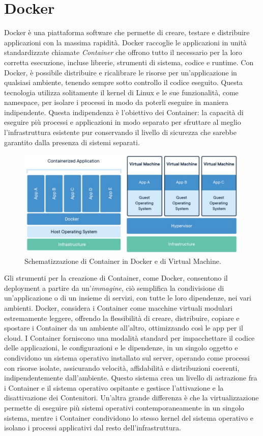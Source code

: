 \section{Docker}
Docker è una piattaforma software che permette di creare, testare e distribuire applicazioni con la massima rapidità. Docker raccoglie 
le applicazioni in unità standardizzate chiamate \textit{Container} che offrono tutto il necessario per la loro corretta esecuzione, incluse librerie, 
strumenti di sistema, codice e runtime. Con Docker, è possibile distribuire e ricalibrare le risorse per un'applicazione in qualsiasi ambiente, 
tenendo sempre sotto controllo il codice eseguito.\hfill\break
Questa tecnologia utilizza solitamente il kernel di Linux e le sue funzionalità, come namespace, per isolare i processi in modo da poterli 
eseguire in maniera indipendente. Questa indipendenza è l'obiettivo dei Container: la capacità di eseguire più processi e applicazioni in 
modo separato per sfruttare al meglio l'infrastruttura esistente pur conservando il livello di sicurezza che sarebbe garantito dalla 
presenza di sistemi separati.
%
\begin{figure}[ht!]
    \centering
    \includegraphics[scale=0.55]{images/Docker_Config_Container.jpg}
    \caption[Schema di funzionamento di un Container in Docker]{Schematizzazione di Container in Docker e di Virtual Machine.}
    \label{fig:DCC}
\end{figure}
\hfill\break
Gli strumenti per la creazione di Container, come Docker, consentono il deployment a partire da un'\textit{immagine}, ciò semplifica la condivisione di 
un'applicazione o di un insieme di servizi, con tutte le loro dipendenze, nei vari ambienti.
Docker, considera i Container come macchine virtuali modulari estremamente leggere, offrendo la flessibilità di creare, distribuire, 
copiare e spostare i Container da un ambiente all'altro, ottimizzando così le app per il cloud.\hfill\break
I Container forniscono una modalità standard per impacchettare il codice delle applicazioni, le configurazioni e le dipendenze, in un singolo oggetto e 
condividono un sistema operativo installato sul server, operando come processi con risorse isolate, assicurando velocità, affidabilità e distribuzioni coerenti, 
indipendentemente dall’ambiente.\hfill\break
%
Questo sistema crea un livello di astrazione fra i Container e il sistema operativo ospitante e gestisce l’attivazione e la disattivazione dei Contenitori. 
Un'altra grande differenza è che la virtualizzazione permette di eseguire più sistemi operativi contemporaneamente in un singolo sistema, mentre i Container 
condividono lo stesso kernel del sistema operativo e isolano i processi applicativi dal resto dell’infrastruttura.
%
